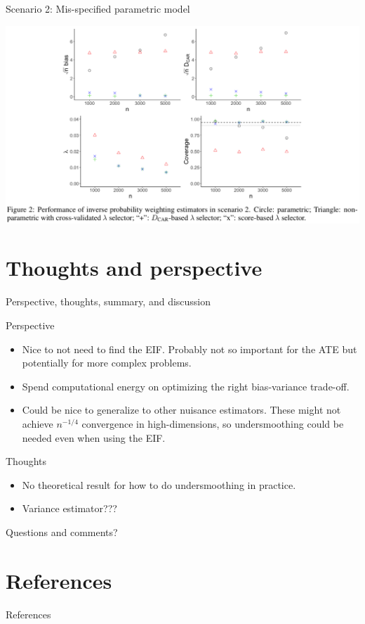 \documentclass[smaller]{beamer}\usepackage{listings}
\begin{document}
\begin{frame}[label={sec:orgfedce5e}]{Scenario 2: Mis-specified parametric model}
\begin{center}
\includegraphics[width=1\textwidth]{./screenshots/scenario2.png}
\end{center}
\end{frame}

\section{Thoughts and perspective}
\label{sec:org7c0b3b0}
\begin{frame}[label={sec:org28d4281}]{Perspective, thoughts, summary, and discussion}
\begin{block}{Perspective}
\begin{itemize}
\item Nice to not need to find the EIF. Probably not so important for the ATE but potentially for more
complex problems.
\item Spend computational energy on optimizing the right bias-variance trade-off.
\item Could be nice to generalize to other nuisance estimators. These might not achieve \(n^{-1/4}\)
convergence in high-dimensions, so undersmoothing could be needed even when using the EIF.
\end{itemize}
\pause
\end{block}
\begin{block}{Thoughts}
\begin{itemize}
\item No theoretical result for how to do undersmoothing in practice.
\item Variance estimator???
\end{itemize}
\pause
\end{block}
\begin{block}{Questions and comments?}
\end{block}
\end{frame}
\section{References}
\label{sec:org9dfcbbb}
\begin{frame}[label={sec:org27b646a}]{References}

\end{frame}
\end{document}
